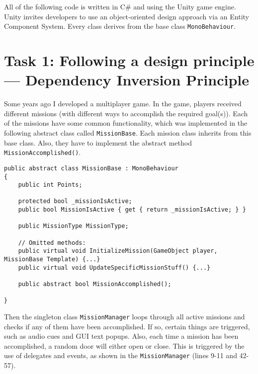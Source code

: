 All of the following code is written in C\# and using the Unity game engine. Unity invites developers to use an object-oriented design approach via an Entity Component System. Every class derives from the base class \texttt{MonoBehaviour}.

\section*{Task 1: Following a design principle --- Dependency Inversion Principle}
Some years ago I developed a multiplayer game. In the game, players received different missions (with different ways to accomplish the required goal(s)). Each of the missions have some common functionality, which was implemented in the following abstract class called \texttt{MissionBase}. Each mission class inherits from this base class. Also, they have to implement the abstract method \texttt{MissionAccomplished()}.

\begin{lstlisting}
public abstract class MissionBase : MonoBehaviour
{
    public int Points;

    protected bool _missionIsActive;
    public bool MissionIsActive { get { return _missionIsActive; } }

    public MissionType MissionType;

	// Omitted methods:
	public virtual void InitializeMission(GameObject player, MissionBase Template) {...}
	public virtual void UpdateSpecificMissionStuff() {...}

    public abstract bool MissionAccomplished();

}
\end{lstlisting}

Then the singleton class \texttt{MissionManager} loops through all active missions and checks if any of them have been accomplished. If so, certain things are triggered, such as audio cues and GUI text popups. Also, each time a mission has been accomplished, a random door will either open or close. This is triggered by the use of delegates and events, as shown in the \texttt{MissionManager} (lines 9-11 and 42-57).

